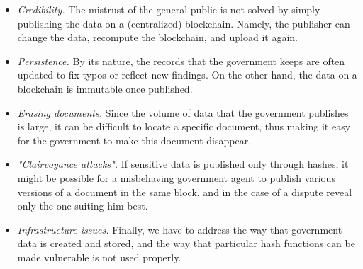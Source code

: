 \begin{itemize}
\item {\it Credibility.} The mistrust of the general public is not solved by simply publishing the data on a (centralized) blockchain. Namely, the publisher can change the data, recompute the blockchain, and upload it again.
\item {\it Persistence.} By its nature, the records that the government keeps are often updated to fix typos or reflect new findings. On the other hand, the data on a blockchain is immutable once published.
\item {\it Erasing documents.} Since the volume of data that the government publishes is large, it can be difficult to locate a specific document, thus making it easy for the government to make this document disappear.
\item {\it "Clairvoyance attacks".} If sensitive data is published only through hashes, it might be possible for a misbehaving government agent to publish various versions of a document in the same block, and in the case of a dispute reveal only the one suiting him best.
\item {\it Infrastructure issues.} Finally, we have to address the way that government data is created and stored, and the way that particular hash functions can be made vulnerable is not used properly. 
\end{itemize}

